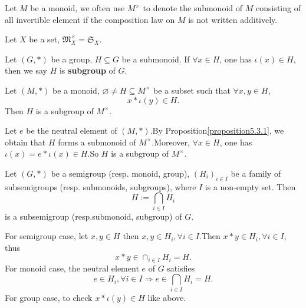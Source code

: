 \documentclass{book}
\numberwithin{equation}{section}
\begin{document}
\begin{notationenv}
    Let $M$ be a monoid,  we often use $M^\times$ to denote the submonoid of $M$ consisting of all invertible element if the composition law on $M$ is not written additively.
\end{notationenv}
\begin{exampleenv}
    Let $X$ be a set,  $\mathfrak{M} _X^\times=\mathfrak{S} _X$.
\end{exampleenv}
\begin{definitionenv}
    Let $(G, *)$ be a group,  $H\subseteq G$ be a submonoid. If $\forall x\in H$,  one has $\iota(x)\in H$,  then we say $H$ is \textbf{subgroup} of $G$.
\end{definitionenv}
\begin{propositionenv}
    Let $(M, *)$ be a monoid,  $\varnothing \not=H\subseteq M^\times$ be a subset such that $\forall x, y \in H$, 
    $$x*\iota(y)\in H.$$
    Then $H$ is a subgroup of $M^\times$.
\end{propositionenv}
\begin{proofenv}
    Let $e$ be the neutral element of $(M, *)$.By Proposition\ref{proposition5.3.1},  we obtain that $H$ forms a submonoid of $M^\times$.Moreover,  $\forall x \in H$,  one has $\iota(x)=e*\iota(x)\in H$.So $H$ is a subgroup of $M^\times$.
\end{proofenv}
\begin{propositionenv}
    Let $(G, *)$ be a semigroup (resp. monoid, group),  $(H_i)_{i\in I}$ be a family of subsemigroups (resp. submonoids, subgroups), where $I$ is a non-empty set. Then 
    $$H:=\bigcap_{i\in I}H_i$$
    is a subsemigroup (resp.submonoid, subgroup) of $G$.
\end{propositionenv}
\begin{proofenv}
    \quad\newline
    For semigroup case, let $x, y\in H$ then $x, y\in H_i, \forall i \in I$.Then $x*y\in H_i, \forall i \in I $,  thus 
    $$x*y\in \cap_{i\in I}H_i=H.$$
    For monoid case, the neutral element $e$ of $G$ satisfies
    $$e \in H_i, \forall i \in I\Rightarrow e\in \bigcap_{i\in I}H_i=H.$$
    For group case, to check $x*\iota(y)\in H$ like above.
\end{proofenv}
\end{document}
